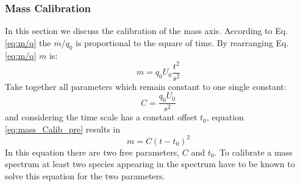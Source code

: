 
	\subsubsection{Mass Calibration}
	In this section we discuss the calibration of the mass axis. According to Eq.\,\eqref{eq:m/q} the $m/q_0$ is proportional to the square of time. By rearranging Eq.\,\eqref{eq:m/q} $m$ is:
	\begin{equation}
		m = q_0 U_0 \frac{t^2}{s^2}
		\label{eq:mass_Calib_pre}
	\end{equation}
	Take together all parameters which remain constant to one single constant: %
	\begin{equation}
		C = \frac{q_0 U_0 }{s^2} 
	\end{equation}
	and considering the time scale has a constant offset $t_0$, equation \eqref{eq:mass_Calib_pre} results in %
	\begin{equation}
		m = C(t-t_0)^2
		\label{eq:mass_Calib}
	\end{equation}
	In this equation there are two free parameters, $C$ and $t_0$. To calibrate a mass spectrum at least two species appearing in the spectrum have to be known to solve this equation for the two parameters.
	
